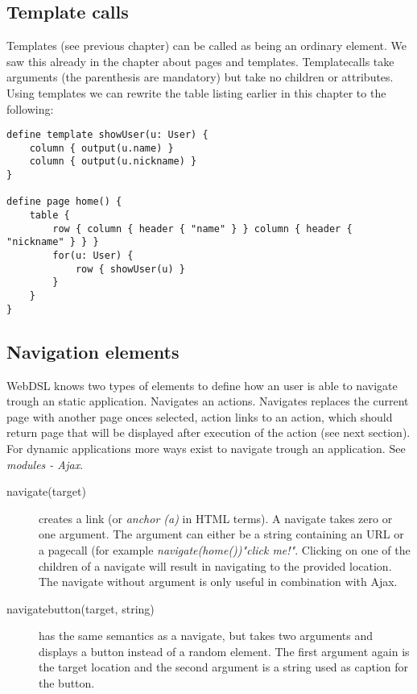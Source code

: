 \subsection{Template calls}
Templates (see previous chapter) can be called as being an ordinary element. We saw this already in the chapter about pages and templates. Templatecalls take arguments (the parenthesis are mandatory) but take no children or attributes. Using templates we can rewrite the table listing earlier in this chapter to the following:
\begin{lstlisting}
define template showUser(u: User) { 
	column { output(u.name) } 
	column { output(u.nickname) }
}

define page home() {
	table {
		row { column { header { "name" } } column { header { "nickname" } } }
		for(u: User) {
			row { showUser(u) }
		}
	}
}
\end{lstlisting}

\subsection{Navigation elements}
WebDSL knows two types of elements to define how an user is able to navigate trough an static application. Navigates an actions. Navigates replaces the current page with another page onces selected, action links to an action, which should return page that will be displayed after execution of the action (see next section). For dynamic applications more ways exist to navigate trough an application. See \emph{modules - Ajax}. 
\begin{description}
	\item[navigate(target){}] creates a link (or \emph{anchor (a)} in HTML terms). A navigate takes zero or one argument. The argument can either be a string containing an URL or a pagecall (for example \emph{navigate(home()){"click me!"}}. Clicking on one of the children of a navigate will result in navigating to the provided location. The navigate without argument is only useful in combination with Ajax. 
	\item[navigatebutton(target, string)] has the same semantics as a navigate, but takes two arguments and displays a button instead of a random element. The first argument again is the target location and the second argument is a string used as caption for the button. 
\end{description}


